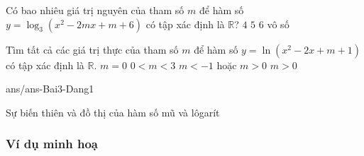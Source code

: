 \begin{ex}
	Có bao nhiêu giá trị nguyên của tham số $m$ để hàm số $y=\log_3(x^2-2mx+m+6)$ có tập xác định là $\mathbb{R}$?
	\choice
	{\True $4$}
	{$5$}
	{$6$}
	{vô số}
\end{ex}



\begin{ex}
	Tìm tất cả các giá trị thực của tham số $m$ để hàm số $y = \ln (x^2 - 2x + m + 1) $ có tập xác định là $\mathbb{R}$.
	\choice
	{$m = 0$}
	{$0<m<3$}
	{$m < -1$ hoặc $m > 0$}
	{\True $m > 0$}
\end{ex}

\begin{indapan}{10}
	{ans/ans-Bai3-Dang1}
\end{indapan}


\begin{dang}{Sự biến thiên và đồ thị của hàm số mũ và lôgarít}
	
\end{dang}

\subsubsection{Ví dụ minh hoạ}

